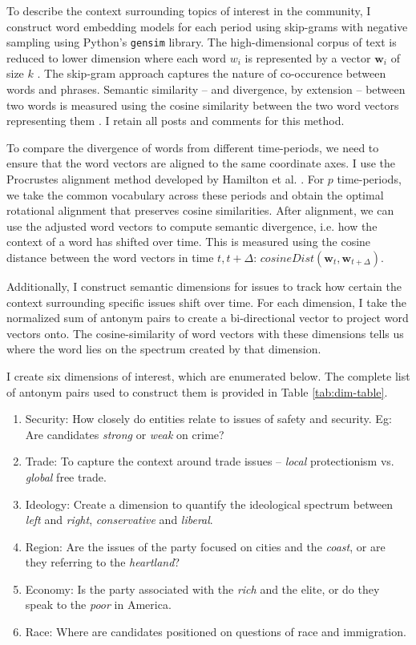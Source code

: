 To describe the context surrounding topics of interest in the community, I construct word embedding models for each period using skip-grams with negative sampling using Python's \texttt{gensim}\citep{rehurek_lrec} library. The high-dimensional corpus of text is reduced to lower dimension where each word $w_i$ is represented by a vector $\textbf{w}_i$ of size $k$ \citep{kozlowski_geometry_2019}. The skip-gram approach captures the nature of co-occurence between words and phrases. Semantic similarity -- and divergence, by extension -- between two words is measured using the cosine similarity between the two word vectors representing them \citep{hamilton_diachronic_2018}. I retain all posts and comments for this method.

To compare the divergence of words from different time-periods, we need to ensure that the word vectors are aligned to the same coordinate axes. I use the Procrustes alignment method developed by Hamilton et al.  \citep{hamilton_diachronic_2018}. For $p$ time-periods, we take the common vocabulary across these periods and obtain the optimal rotational alignment that preserves cosine similarities. After alignment, we can use the adjusted word vectors to compute semantic divergence, i.e. how the context of a word has shifted over time. This is measured using the cosine distance between the word vectors in time $t, t + \Delta$: $cosineDist(\textbf{w}_t, \textbf{w}_{t+\Delta})$. \citep{hamilton_diachronic_2018}

Additionally, I construct semantic dimensions for issues to track how certain the context surrounding specific issues shift over time. For each dimension, I take the normalized sum of antonym pairs to create a bi-directional vector to project word vectors onto. \citep{kozlowski_geometry_2019} The cosine-similarity of word vectors with these dimensions tells us where the word lies on the spectrum created by that dimension. 

I create six dimensions of interest, which are enumerated below. The complete list of antonym pairs used to construct them is provided in Table \ref{tab:dim-table}.

\begin{enumerate}
    \item Security: How closely do entities relate to issues of safety and security. Eg: Are candidates \textit{strong} or \textit{weak} on crime?
    \item Trade: To capture the context around trade issues -- \textit{local} protectionism vs. \textit{global} free trade.
    \item Ideology: Create a dimension to quantify the ideological spectrum between \textit{left} and \textit{right}, \textit{conservative} and \textit{liberal}.
    \item Region: Are the issues of the party focused on cities and the \textit{coast}, or are they referring to the \textit{heartland}?
    \item Economy: Is the party associated with the \textit{rich} and the elite, or do they speak to the \textit{poor} in America.
    \item Race: Where are candidates positioned on questions of race and immigration.
\end{enumerate}

